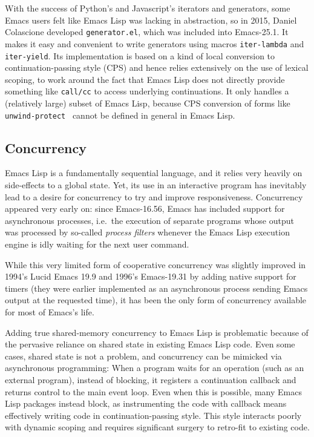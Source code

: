 \documentclass[format=acmsmall, review]{acmart}
\newcommand \Elisp {Emacs Lisp}
\begin{document}
With the success of Python's and Javascript's iterators and generators, some
Emacs users felt like \Elisp{} was lacking in abstraction, so in 2015,
Daniel Colascione developed \texttt{generator.el}, which was included
into Emacs-25.1.  It makes it easy and convenient to write generators using
macros \texttt{iter-lambda} and \texttt{iter-yield}.  Its implementation is
based on a kind of local conversion to continuation-passing style (CPS) and
hence relies extensively on the use of lexical scoping, to work around the
fact that \Elisp{} does not directly provide something like \texttt{call/cc}
to access underlying continuations.  It only handles a (relatively large)
subset of \Elisp{}, because CPS conversion of forms like
\texttt{unwind-protect}~\cite{HaynesFriedman1987} cannot be defined in general in \Elisp.

\subsection{Concurrency}
\label{sec:concurrency}

\Elisp{} is a fundamentally sequential language, and it relies very heavily
on side-effects to a global state.  Yet, its use in an interactive program
has inevitably lead to a desire for concurrency to try and improve
responsiveness.  Concurrency appeared very early on: since
Emacs-16.56, Emacs has included support for asynchronous processes, i.e.~the
execution of separate programs whose output was processed by so-called
\emph{process filters} whenever the \Elisp{} execution engine is idly
waiting for the next user command.

While this very limited form of cooperative concurrency was slightly
improved in 1994's Lucid Emacs 19.9 and 1996's Emacs-19.31 by adding native support for timers (they
were earlier implemented as an asynchronous process sending Emacs output at
the requested time), it has been the only form of concurrency available for
most of Emacs's life.

Adding true shared-memory concurrency to \Elisp{} is problematic
because of the pervasive reliance on shared state in existing \Elisp{}
code.  Even some cases, shared state is not a problem, and concurrency
can be mimicked via asynchronous programming: When a program waits for
an operation (such as an external program), instead of blocking, it
registers a continuation callback and returns control to the main
event loop.  Even when this is possible, many \Elisp{} packages 
instead block, as instrumenting the code with callback means
effectively writing code in continuation-passing style.  This style
interacts poorly with dynamic scoping and requires significant surgery
to retro-fit to existing code.
\end{document}
